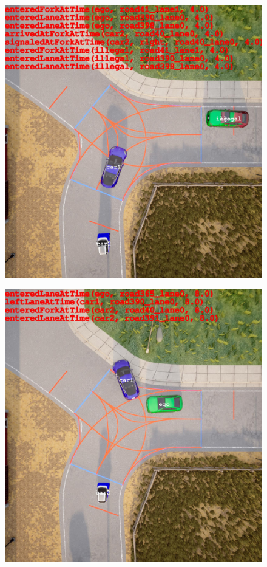 \begin{figure}[ht]%
  \centering
  \begin{minipage}[t]{.499\linewidth}
    {\includegraphics[width=\linewidth]{figures/chapter4/Y-intersection/1_80.jpg}}%
  \end{minipage}%
  \hfill
  \begin{minipage}[t]{.499\linewidth}
    {\includegraphics[width=\linewidth]{figures/chapter4/Y-intersection/1_160.jpg}}%

\end{minipage}
\end{figure}
